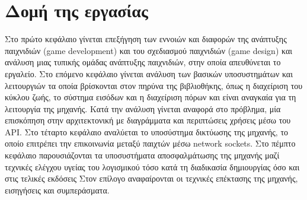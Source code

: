 \section{Δομή της εργασίας}
	Στο πρώτο κεφάλαιο γίνεται επεξήγηση των εννοιών και διαφορών της ανάπτυξης παιχνιδιών (game development) και του σχεδιασμού παιχνιδιών (game design) και ανάλυση μιας τυπικής ομάδας ανάπτυξης παιχνιδιών, στην οποία απευθύνεται το εργαλείο.
	Στο επόμενο κεφάλαιο γίνεται ανάλυση των βασικών υποσυστημάτων και λειτουργιών τα οποία βρίσκονται στον πηρύνα της βιβλιοθήκης, όπως η διαχείριση του κύκλου ζωής, το σύστημα εισόδων και η διαχείριση πόρων και είναι αναγκαία για τη λειτουργία της μηχανής. Κατά την ανάλυση γίνεται αναφορά στο πρόβλημα, μία επισκόπηση στην αρχιτεκτονική με διαγράμματα και περιπτώσεις χρήσεις μέσω του \gls{API}.
    Στο τέταρτο κεφάλαιο αναλύεται το υποσύστημα δικτύωσης της μηχανής, το οποίο επιτρέπει την επικοινωνία μεταξύ παιχτών μέσω network sockets.
	Στο πέμπτο κεφάλαιο παρουσιάζονται τα υποσυστήματα αποσφαλμάτωσης της μηχανής μαζί τεχνικές ελέγχου υγείας του λογισμικού τόσο κατά τη διαδικασία δημιουργίας όσο και στις τελικές εκδόσεις 
	Στον επίλογο αναφαίρονται οι τεχνικές επέκτασης της μηχανής, εισηγήσεις και συμπεράσματα.
